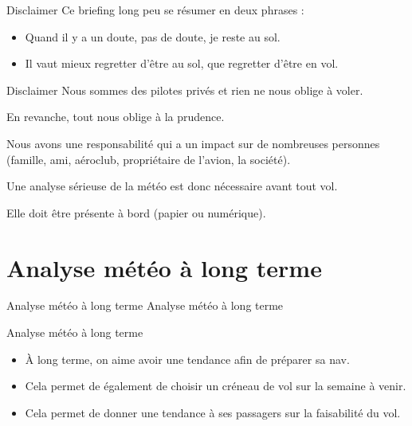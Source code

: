 \documentclass{beamer}
\begin{document}
\begin{frame}{Disclaimer}
  Ce briefing long peu se résumer en deux phrases :
  
  \begin{itemize}
    \item Quand il y a un doute, pas de doute, je reste au sol.
    \item Il vaut mieux regretter d'être au sol, que regretter d'être en vol.
  \end{itemize}  
\end{frame}

\begin{frame}{Disclaimer}
  Nous sommes des pilotes privés et rien ne nous oblige à voler.

  En revanche, tout nous oblige à la prudence.

  Nous avons une responsabilité qui a un impact sur de nombreuses
  personnes (famille, ami, aéroclub, propriétaire de l'avion, la société).

  Une analyse sérieuse de la météo est donc nécessaire avant tout vol.

  Elle doit être présente à bord (papier ou numérique).
\end{frame}

\section{Analyse météo à long terme}
\begin{frame}{Analyse météo à long terme}
  \LARGE{Analyse météo à long terme}
\end{frame}

\begin{frame}{Analyse météo à long terme}
  \begin{itemize}
    \item À long terme, on aime avoir une tendance afin de préparer sa nav.\pause
    \item Cela permet de également de choisir un créneau de vol sur la semaine à venir.\pause
    \item Cela permet de donner une tendance à ses passagers sur la faisabilité du vol.\pause
  \end{itemize}
\end{frame}
\end{document}
